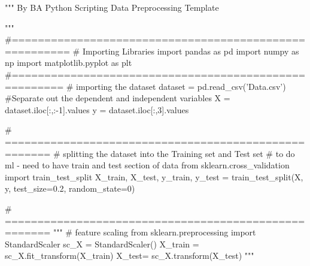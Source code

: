 """
By BA
Python Scripting
Data Preprocessing Template 

"""
#=======================================================
# Importing Libraries
import pandas as pd
import numpy as np
import matplotlib.pyplot as plt
#======================================================
# importing the dataset
dataset = pd.read_csv('Data.csv')
#Separate out the dependent and independent variables
X = dataset.iloc[:,:-1].values
y = dataset.iloc[:,3].values

# =====================================================
# splitting the dataset into the Training set and Test set
# to do ml - need to have train  and test section of data
from sklearn.cross_validation import train_test_split
X_train, X_test, y_train, y_test = train_test_split(X, y, test_size=0.2, random_state=0)

# =====================================================
"""
# feature scaling
from sklearn.preprocessing import StandardScaler
sc_X = StandardScaler()
X_train = sc_X.fit_transform(X_train)
X_test= sc_X.transform(X_test)
"""